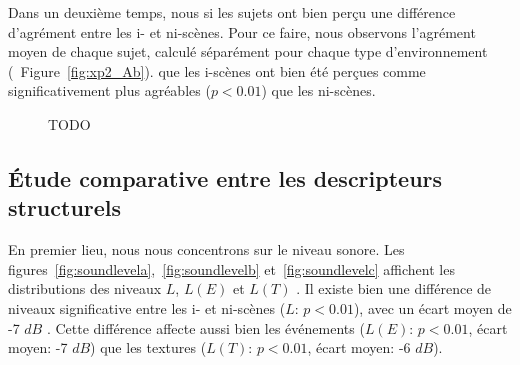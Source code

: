 Dans un deuxième temps, nous   si les sujets ont bien perçu une différence d'agrément entre les i- et ni-scènes. Pour ce faire, nous observons l'agrément moyen de chaque sujet, calculé séparément pour chaque type d'environnement (\Cf~Figure~\ref{fig:xp2_Ab}).   que les i-scènes ont bien été perçues comme significativement plus agréables ($p<0.01$) que les ni-scènes.

\begin{figure}[t]
        \myfloatalign
       \caption[TODO]{TODO}\label{fig:xp2_A}
\end{figure}
 
\subsection{Étude comparative entre les descripteurs structurels}

En premier lieu, nous nous concentrons sur le niveau sonore. Les figures~\ref{fig:soundlevela},~\ref{fig:soundlevelb} et~\ref{fig:soundlevelc} affichent les distributions des niveaux $L$, $L(E)$ et $L(T)$ . Il existe bien une différence de niveaux significative entre les i- et ni-scènes ($L$: $p<0.01$), avec un écart moyen de -7 $dB$ . Cette différence affecte aussi bien les événements ($L(E)$: $p<0.01$, écart moyen: -7 $dB$) que les textures ($L(T)$: $p<0.01$, écart moyen: -6 $dB$). 

